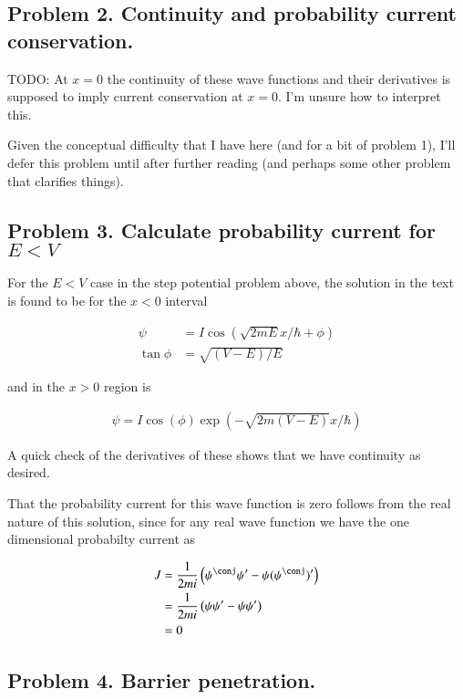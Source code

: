 \documentclass{article}
\begin{document}
\subsection{ Problem 2.  Continuity and probability current conservation. }

TODO:
At $x=0$ the continuity of these wave functions and their derivatives 
is supposed to imply current conservation at $x=0$.  I'm unsure how to
interpret this.

Given the conceptual difficulty that I have here (and for a bit of problem 1),
I'll defer this problem
until after further reading (and perhaps
some other problem that clarifies things).

\subsection{ Problem 3.  Calculate probability current for $E<V$ }

For the $E<V$ case in the step potential problem above, the solution in the 
text is found to be for the $x<0$ interval

\begin{align*}
\psi &= I \cos\left( \sqrt{2mE} x/\hbar + \phi \right) \\
\tan\phi &= \sqrt{(V-E)/E}
\end{align*}

and in the $x>0$ region is

\begin{align*}
\psi = I \cos\left( \phi \right) \exp\left( -\sqrt{2m(V-E)} x/\hbar \right)
\end{align*}

A quick check of the derivatives of these shows that we have continuity as desired.

That the probability current for this wave function is zero follows from the real nature of this solution, since for any real
wave function we have the one dimensional probabilty current as

\begin{align*}
J 
&= \inv{2mi}\left( \psi^\conj \psi' - \psi (\psi^\conj)' \right) \\
&= \inv{2mi}\left( \psi \psi' - \psi \psi' \right) \\
&= 0
\end{align*}

\subsection{ Problem 4.  Barrier penetration. }
\end{document}
